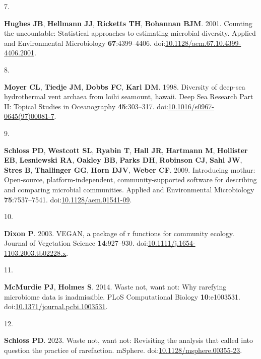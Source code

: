 \documentclass[
]{article}
\newlength{\cslhangindent}
\newlength{\csllabelwidth}
\newlength{\cslentryspacingunit} %
\newenvironment{CSLReferences}[2] %
 {%
  \setlength{\parindent}{0pt}
  \ifodd #1
  \let\oldpar\par
  \def\par{\hangindent=\cslhangindent\oldpar}
  \fi
  \setlength{\parskip}{#2\cslentryspacingunit}
 }%
 {}
\newcommand{\CSLLeftMargin}[1]{\parbox[t]{\csllabelwidth}{#1}}
\newcommand{\CSLRightInline}[1]{\parbox[t]{\linewidth - \csllabelwidth}{#1}\break}
\begin{document}
\begin{CSLReferences}{0}{1}
\leavevmode{}%
\CSLLeftMargin{7. }%
\CSLRightInline{\textbf{Hughes JB}, \textbf{Hellmann JJ},
\textbf{Ricketts TH}, \textbf{Bohannan BJM}. 2001. Counting the
uncountable: Statistical approaches to estimating microbial diversity.
Applied and Environmental Microbiology \textbf{67}:4399--4406.
doi:\href{https://doi.org/10.1128/aem.67.10.4399-4406.2001}{10.1128/aem.67.10.4399-4406.2001}.}

\leavevmode{}%
\CSLLeftMargin{8. }%
\CSLRightInline{\textbf{Moyer CL}, \textbf{Tiedje JM}, \textbf{Dobbs
FC}, \textbf{Karl DM}. 1998. Diversity of deep-sea hydrothermal vent
archaea from loihi seamount, hawaii. Deep Sea Research Part {II}:
Topical Studies in Oceanography \textbf{45}:303--317.
doi:\href{https://doi.org/10.1016/s0967-0645(97)00081-7}{10.1016/s0967-0645(97)00081-7}.}

\leavevmode{}%
\CSLLeftMargin{9. }%
\CSLRightInline{\textbf{Schloss PD}, \textbf{Westcott SL},
\textbf{Ryabin T}, \textbf{Hall JR}, \textbf{Hartmann M},
\textbf{Hollister EB}, \textbf{Lesniewski RA}, \textbf{Oakley BB},
\textbf{Parks DH}, \textbf{Robinson CJ}, \textbf{Sahl JW}, \textbf{Stres
B}, \textbf{Thallinger GG}, \textbf{Horn DJV}, \textbf{Weber CF}. 2009.
Introducing mothur: Open-source, platform-independent,
community-supported software for describing and comparing microbial
communities. Applied and Environmental Microbiology
\textbf{75}:7537--7541.
doi:\href{https://doi.org/10.1128/aem.01541-09}{10.1128/aem.01541-09}.}

\leavevmode{}%
\CSLLeftMargin{10. }%
\CSLRightInline{\textbf{Dixon P}. 2003. {VEGAN}, a package of r
functions for community ecology. Journal of Vegetation Science
\textbf{14}:927--930.
doi:\href{https://doi.org/10.1111/j.1654-1103.2003.tb02228.x}{10.1111/j.1654-1103.2003.tb02228.x}.}

\leavevmode{}%
\CSLLeftMargin{11. }%
\CSLRightInline{\textbf{McMurdie PJ}, \textbf{Holmes S}. 2014. Waste
not, want not: Why rarefying microbiome data is inadmissible. {PLoS}
Computational Biology \textbf{10}:e1003531.
doi:\href{https://doi.org/10.1371/journal.pcbi.1003531}{10.1371/journal.pcbi.1003531}.}

\leavevmode{}%
\CSLLeftMargin{12. }%
\CSLRightInline{\textbf{Schloss PD}. 2023. Waste not, want not:
Revisiting the analysis that called into question the practice of
rarefaction. mSphere.
doi:\href{https://doi.org/10.1128/msphere.00355-23}{10.1128/msphere.00355-23}.}


\end{CSLReferences}
\end{document}
